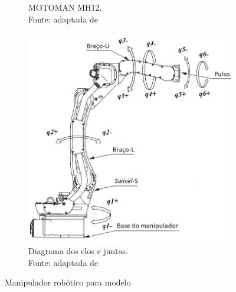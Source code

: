 \begin{figure}[h]
\begin{subfigure}[b]{0.3\textwidth}
        \caption{MOTOMAN MH12. \\Fonte: adaptada de~\cite{manualmh12}}
        \label{fig::mh12_foto}
    \end{subfigure}
    \quad %
    \begin{subfigure}[b]{0.5\textwidth}
        \includegraphics[width=\textwidth]{figs/mh12_diagram}
        \caption{Diagrama dos elos e juntas. \\Fonte: adaptada de~\cite{manualmh12}}
        \label{fig::mh12_diagram}
    \end{subfigure}
    \caption{Manipulador robótico para modelo}\label{fig::resumo_mh12}
\end{figure}

